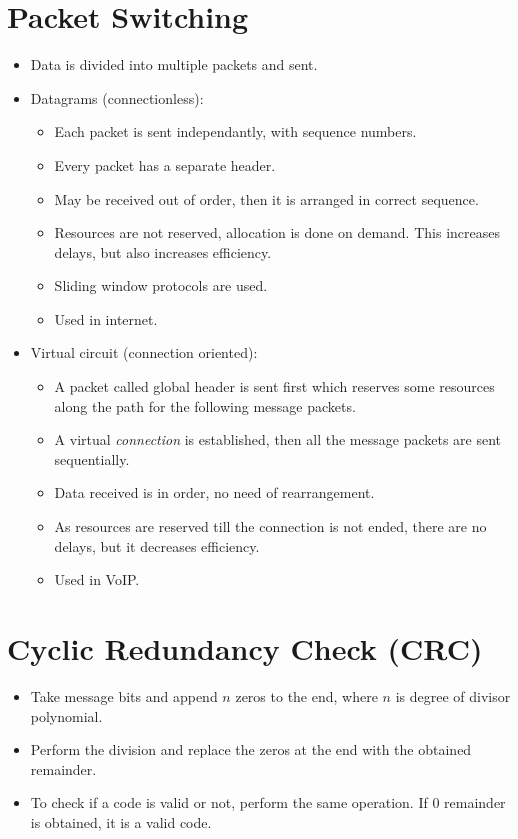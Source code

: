 \documentclass{article}
\begin{document}
\section{Packet Switching}
\renewcommand{\labelitemi}{\textbullet}
\renewcommand{\labelitemii}{\textendash}
\begin{itemize}
	\item Data is divided into multiple packets and sent.
	\item Datagrams (connectionless):
	\begin{itemize}
		\item Each packet is sent independantly, with sequence numbers.
		\item Every packet has a separate header.
		\item May be received out of order, then it is arranged in correct sequence.
		\item Resources are not reserved, allocation is done on demand. This increases delays, but also increases efficiency.
		\item Sliding window protocols are used.
		\item Used in internet.
	\end{itemize}
	\item Virtual circuit (connection oriented):
	\begin{itemize}
		\item A packet called global header is sent first which reserves some resources along the path for the following message packets.
		\item A virtual \emph{connection} is established, then all the message packets are sent sequentially.
		\item Data received is in order, no need of rearrangement.
		\item As resources are reserved till the connection is not ended, there are no delays, but it decreases efficiency.
		\item Used in VoIP.
	\end{itemize}
\end{itemize}
\section*{Cyclic Redundancy Check (CRC)}
\begin{itemize}
	\item Take message bits and append $n$ zeros to the end, where $n$ is degree of divisor polynomial.
	\item Perform the division and replace the zeros at the end with the obtained remainder.
	\item To check if a code is valid or not, perform the same operation. If 0 remainder is obtained, it is a valid code.
\end{itemize}
\end{document}
